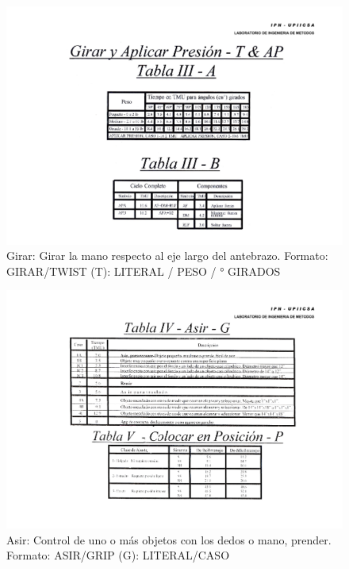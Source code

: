     
    \begin{figure}[H]
        \centering
        \includegraphics[scale=0.38]{15/img/tabla3GirarAplicarPresion-A.pdf}
        \caption{Girar: Girar la mano respecto al eje largo del antebrazo. Formato: GIRAR/TWIST (T): LITERAL / PESO / ° GIRADOS}
        \label{fig:tabla3GirarAplicarPresion-A}
    \end{figure}
    
    
    \begin{figure}[H]
        \centering
        \includegraphics[scale=0.35]{15/img/tabla4Asir.pdf}
        \caption{Asir: Control de uno o más objetos con los dedos o mano, prender. Formato: ASIR/GRIP (G): LITERAL/CASO}
        \label{fig:tabla4Asir}
    \end{figure}
    
